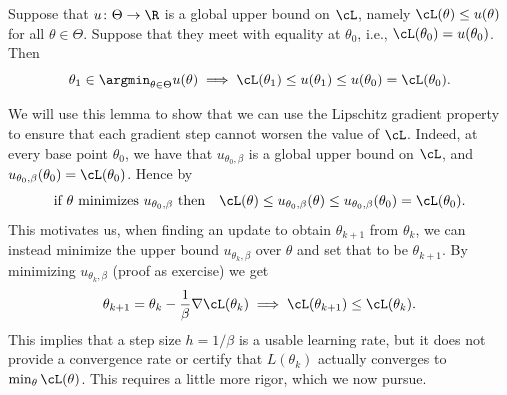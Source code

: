 \documentclass[../../book-main.tex]{subfiles}
\begin{document}
\begin{lemma}\label{lem:majorization_minimization}
    Suppose that \(u \colon \Theta \to \R\) is a global upper bound on \(\cL\), namely \(\cL(\theta) \leq u(\theta)\) for all \(\theta \in \Theta\). Suppose that they meet with equality at \(\theta_{0}\), i.e., \(\cL(\theta_{0}) = u(\theta_{0})\). Then
    \begin{equation}
        \theta_{1} \in \argmin_{\theta \in \Theta}u(\theta) \implies \cL(\theta_{1}) \leq u(\theta_{1}) \leq u(\theta_{0}) = \cL(\theta_{0}).
    \end{equation}
\end{lemma}

We will use this lemma to show that we can use the Lipschitz gradient property to ensure that each gradient step cannot worsen the value of \(\cL\). Indeed, at every base point \(\theta_{0}\), we have that \(u_{\theta_{0}, \beta}\) is a global upper bound on \(\cL\), and \(u_{\theta_{0}, \beta}(\theta_{0}) = \cL(\theta_{0})\). Hence by 
\begin{equation}
    \text{if \(\theta\) minimizes \(u_{\theta_{0}, \beta}\) then} \quad \cL(\theta) \leq u_{\theta_{0}, \beta}(\theta) \leq u_{\theta_{0}, \beta}(\theta_{0}) = \cL(\theta_{0}).
\end{equation}
This motivates us, when finding an update to obtain \(\theta_{k + 1}\) from \(\theta_{k}\), we can instead minimize the upper bound \(u_{\theta_{k}, \beta}\) over \(\theta\) and set that to be \(\theta_{k + 1}\). By minimizing \(u_{\theta_{k}, \beta}\) (proof as exercise) we get 
\begin{equation}
    \theta_{k + 1} = \theta_{k} - \frac{1}{\beta}\nabla \cL(\theta_{k}) \implies \cL(\theta_{k + 1}) \leq \cL(\theta_{k}).
\end{equation}
This implies that a step size \(h = 1/\beta\) is a usable learning rate, but it does not provide a convergence rate or certify that \(L(\theta_{k})\) actually converges to \(\min_{\theta}\cL(\theta)\). This requires a little more rigor, which we now pursue.
\end{document}

